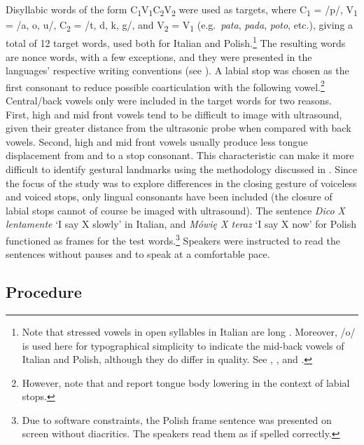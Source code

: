 \documentclass[12pt,]{article}
\let\rmarkdownfootnote\footnote%
\def\footnote{\protect\rmarkdownfootnote}
\begin{document}
Disyllabic words of the form
C\textsubscript{1}V\textsubscript{1}C\textsubscript{2}V\textsubscript{2}
were used as targets, where C\textsubscript{1} = /p/, V\textsubscript{1}
= /a, o, u/, C\textsubscript{2} = /t, d, k, g/, and V\textsubscript{2} =
V\textsubscript{1} (e.g.~\emph{pata}, \emph{pada}, \emph{poto}, etc.),
giving a total of 12 target words, used both for Italian and
Polish.\footnote{Note that stressed vowels in open syllables in Italian are long \citep{renwick2016}. Moreover, /o/ is used here for typographical simplicity to indicate the mid-back vowels of Italian and Polish, although they do differ in quality. See \citet{kramer2009}, \citet{renwick2016}, and \citet{gussmann2007}.}
The resulting words are nonce words, with a few exceptions, and they
were presented in the languages' respective writing conventions (see
). A labial stop was chosen as the first consonant to
reduce possible coarticulation with the following
vowel.\footnote{However, note that \citet{westbury1983} and \citet{vazquez-alvarez2007} report tongue body lowering in the context of labial stops.}
Central/back vowels only were included in the target words for two
reasons. First, high and mid front vowels tend to be difficult to image
with ultrasound, given their greater distance from the ultrasonic probe
when compared with back vowels. Second, high and mid front vowels
usually produce less tongue displacement from and to a stop consonant.
This characteristic can make it more difficult to identify gestural
landmarks using the methodology discussed in . Since the
focus of the study was to explore differences in the closing gesture of
voiceless and voiced stops, only lingual consonants have been included
(the closure of labial stops cannot of course be imaged with
ultrasound). The sentence \emph{Dico X lentamente} `I say X slowly' in
Italian, and \emph{Mówię X teraz} `I say X now' for Polish functioned as
frames for the test
words.\footnote{Due to software constraints, the Polish frame sentence was presented on screen without diacritics. The speakers read them as if spelled correctly.}
Speakers were instructed to read the sentences without pauses and to
speak at a comfortable pace.

\hypertarget{procedure}{%
\subsection{Procedure}\label{procedure}}
\end{document}
